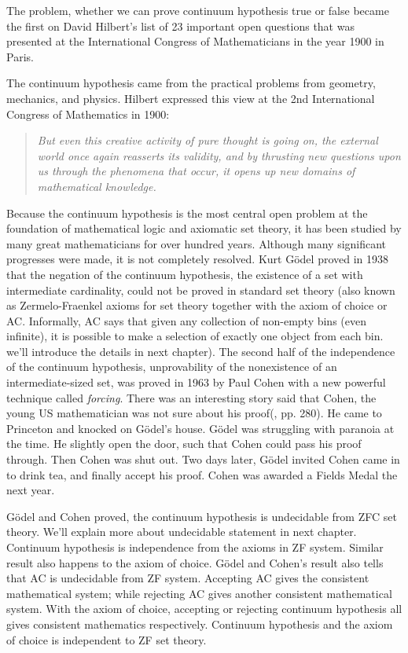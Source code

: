 \documentclass{article}
\begin{document}
The problem, whether we can prove continuum hypothesis true or false became the first on David Hilbert's list of 23 important open questions that was presented at the International Congress of Mathematicians in the year 1900 in Paris.

The continuum hypothesis came from the practical problems from geometry, mechanics, and physics. Hilbert expressed this view at the 2nd International Congress of Mathematics in 1900:

\begin{quotation}
\itshape
But even this creative activity of pure thought is going on, the external world once again reasserts its validity, and by thrusting new questions upon us through the phenomena that occur, it opens up new domains of mathematical knowledge.
\end{quotation}

Because the continuum hypothesis is the most central open problem at the foundation of mathematical logic and axiomatic set theory, it has been studied by many great mathematicians for over hundred years. Although many significant progresses were made, it is not completely resolved. Kurt Gödel proved in 1938 that the negation of the continuum hypothesis, the existence of a set with intermediate cardinality, could not be proved in standard set theory (also known as Zermelo-Fraenkel axioms for set theory together with the axiom of choice or AC. Informally, AC says that given any collection of non-empty bins (even infinite), it is possible to make a selection of exactly one object from each bin. we'll introduce the details in next chapter). The second half of the independence of the continuum hypothesis, unprovability of the nonexistence of an intermediate-sized set, was proved in 1963 by Paul Cohen with a new powerful technique called {\em forcing}. There was an interesting story said that Cohen, the young US mathematician was not sure about his proof(\cite{HanXueTao16}, pp. 280). He came to Princeton and knocked on Gödel's house. Gödel was struggling with paranoia at the time. He slightly open the door, such that Cohen could pass his proof through. Then Cohen was shut out. Two days later, Gödel invited Cohen came in to drink tea, and finally accept his proof. Cohen was awarded a Fields Medal the next year.

Gödel and Cohen proved, the continuum hypothesis is undecidable from ZFC set theory. We'll explain more about undecidable statement in next chapter. Continuum hypothesis is independence from the axioms in ZF system. Similar result also happens to the axiom of choice. Gödel and Cohen's result also tells that AC is undecidable from ZF system. Accepting AC gives the consistent mathematical system; while rejecting AC gives another consistent mathematical system. With the axiom of choice, accepting or rejecting continuum hypothesis all gives consistent mathematics respectively. Continuum hypothesis and the axiom of choice is independent to ZF set theory\cite{GCH}.
\end{document}
